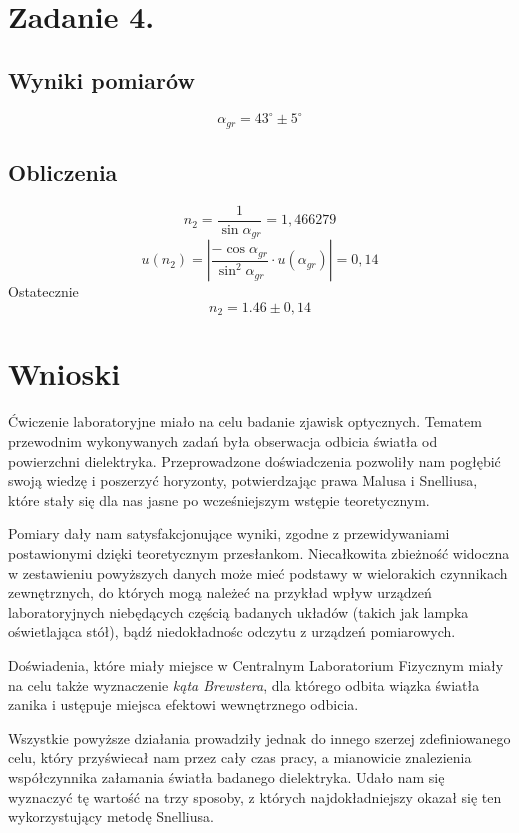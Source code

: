 \documentclass[10pt,a4paper]{article}
\begin{document}
\section{Zadanie 4.}
\subsection{Wyniki pomiarów}
\begin{equation}
\alpha_{gr} = 43^\circ \pm 5^\circ
\end{equation} 
\subsection{Obliczenia}
\begin{equation}
n_2 = \frac{1}{\sin{\alpha_{gr}}} = 1,466279
\end{equation} 
\begin{equation}
u(n_2) = |\frac{-\cos{\alpha_{gr}}}{\sin^2{\alpha_{gr}}}\cdot u(\alpha_{gr})| = 0,14 
\end{equation} 
Ostatecznie
\begin{equation}
n_2 = 1.46 \pm 0,14
\end{equation} 
\section{Wnioski}
Ćwiczenie laboratoryjne miało na celu badanie zjawisk optycznych. Tematem przewodnim wykonywanych zadań była obserwacja odbicia światła od powierzchni dielektryka. Przeprowadzone doświadczenia pozwoliły nam pogłębić swoją wiedzę i poszerzyć horyzonty, potwierdzając prawa Malusa i Snelliusa, które stały się dla nas jasne po wcześniejszym wstępie teoretycznym.

Pomiary dały nam satysfakcjonujące wyniki, zgodne z przewidywaniami postawionymi dzięki teoretycznym przesłankom.
Niecałkowita zbieżność widoczna w zestawieniu powyższych danych może mieć podstawy w wielorakich czynnikach zewnętrznych, do których mogą należeć na przykład wpływ urządzeń laboratoryjnych niebędących częścią badanych układów (takich jak lampka oświetlająca stół), bądź niedokładnośc odczytu z urządzeń pomiarowych.

Doświadenia, które miały miejsce w Centralnym Laboratorium Fizycznym miały na celu także wyznaczenie \emph{kąta Brewstera}, dla którego odbita wiązka światła zanika i ustępuje miejsca efektowi wewnętrznego odbicia.

Wszystkie powyższe działania prowadziły jednak do innego szerzej zdefiniowanego celu, który przyświecał nam przez cały czas pracy, a mianowicie znalezienia współczynnika załamania światła badanego dielektryka. Udało nam się wyznaczyć tę wartość na trzy sposoby, z których najdokładniejszy okazał się ten wykorzystujący metodę Snelliusa.
\end{document}
